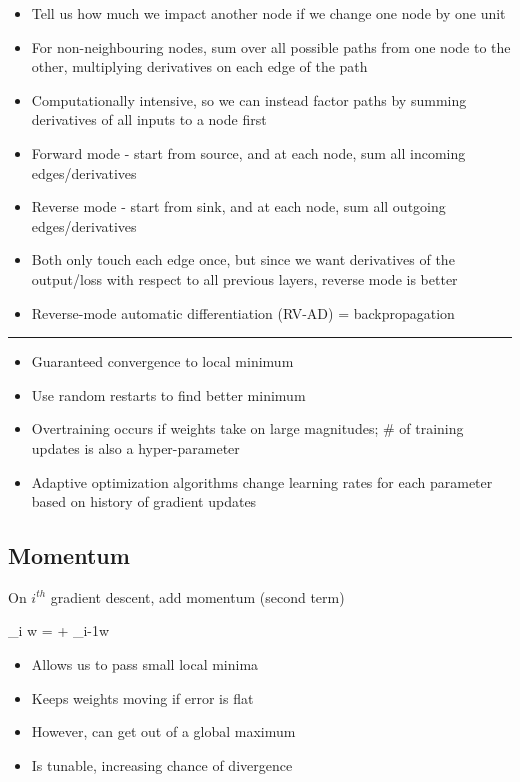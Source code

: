 \documentclass[12pt]{article}
\newcommand{\divider}[0]{\par\textcolor{lightgray}{\rule{\textwidth}{0.1pt}}}
\newenvironment{eqn}{\equation\alignedat{3}}{\endalignedat\endequation}
\begin{document}
\begin{itemize}
	\item Tell us how much we impact another node if we change one node by one unit
	\item For non-neighbouring nodes, sum over all possible paths from one node to the other, multiplying derivatives on each edge of the path
	\item Computationally intensive, so we can instead factor paths by summing derivatives of all inputs to a node first
	\item Forward mode - start from source, and at each node, sum all incoming edges/derivatives
	\item Reverse mode - start from sink, and at each node, sum all outgoing edges/derivatives
	\item Both only touch each edge once, but since we want derivatives of the output/loss with respect to all previous layers, reverse mode is better 
	\item Reverse-mode automatic differentiation (RV-AD) = backpropagation
\end{itemize}

\divider

\begin{itemize}
	\item Guaranteed convergence to local minimum 
	\item Use random restarts to find better minimum 
	\item Overtraining occurs if weights take on large magnitudes; \# of training updates is also a hyper-parameter 
	\item Adaptive optimization algorithms change learning rates for each parameter based on history of gradient updates
\end{itemize}

\subsection{Momentum}

On $i^{th}$ gradient descent, add momentum (second term)
	
\begin{eqn}
	\Delta_i w = \alpha {} + \beta \Delta_{i-1}w
\end{eqn}

\begin{itemize}
	\item Allows us to pass small local minima 
	\item Keeps weights moving if error is flat
	\item However, can get out of a global maximum 
	\item Is tunable, increasing chance of divergence
\end{itemize}
\end{document}
